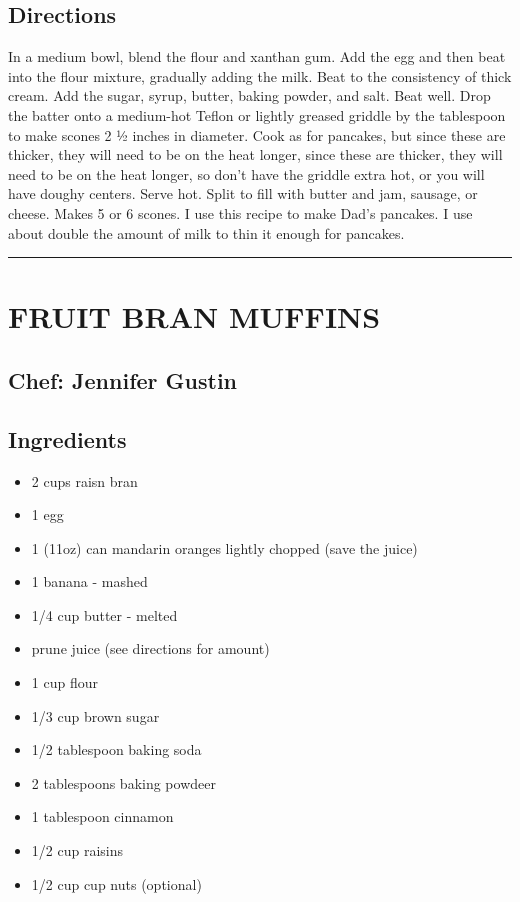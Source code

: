 \documentclass[
]{book}
\providecommand{\tightlist}{%
  \setlength{\itemsep}{0pt}\setlength{\parskip}{0pt}}
\begin{document}
\hypertarget{directions-77}{%
\subsection*{Directions}\label{directions-77}}


In a medium bowl, blend the flour and xanthan gum. Add the egg and then beat into the flour mixture, gradually adding the milk. Beat to the consistency of thick cream. Add the sugar, syrup, butter, baking powder, and salt. Beat well. Drop the batter onto a medium-hot Teflon or lightly greased griddle by the tablespoon to make scones 2 ½ inches in diameter. Cook as for pancakes, but since these are thicker, they will need to be on the heat longer, since these are thicker, they will need to be on the heat longer, so don't have the griddle extra hot, or you will have doughy centers. Serve hot. Split to fill with butter and jam, sausage, or cheese. Makes 5 or 6 scones. I use this recipe to make Dad's pancakes. I use about double the amount of milk to thin it enough for pancakes.

\begin{center}\rule{0.5\linewidth}{0.5pt}\end{center}

\hypertarget{fruit-bran-muffins}{%
\section*{FRUIT BRAN MUFFINS}\label{fruit-bran-muffins}}


\hypertarget{chef-jennifer-gustin-10}{%
\subsection*{Chef: Jennifer Gustin}\label{chef-jennifer-gustin-10}}


\hypertarget{ingredients-78}{%
\subsection*{Ingredients}\label{ingredients-78}}


\begin{itemize}
\tightlist
\item
  2 cups raisn bran
\item
  1 egg
\item
  1 (11oz) can mandarin oranges lightly chopped (save the juice)
\item
  1 banana - mashed
\item
  1/4 cup butter - melted
\item
  prune juice (see directions for amount)
\item
  1 cup flour
\item
  1/3 cup brown sugar
\item
  1/2 tablespoon baking soda
\item
  2 tablespoons baking powdeer
\item
  1 tablespoon cinnamon
\item
  1/2 cup raisins
\item
  1/2 cup cup nuts (optional)
\end{itemize}
\end{document}
